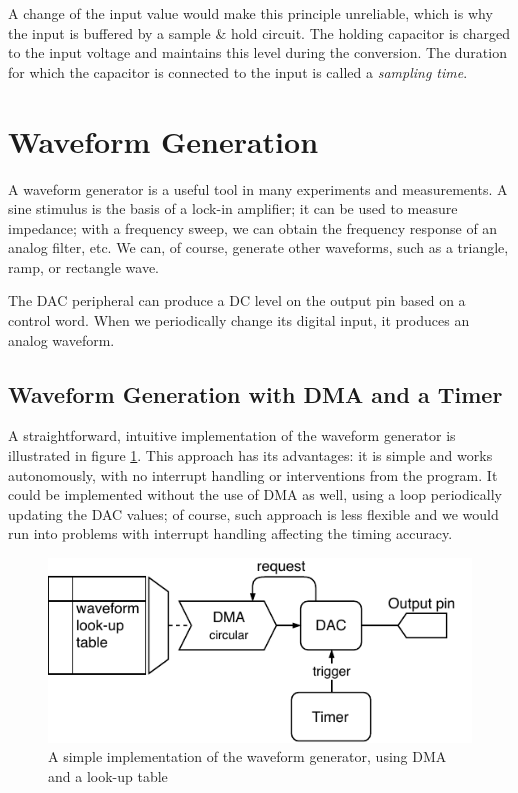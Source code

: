 A change of the input value would make this principle unreliable, which is why the input is buffered by a sample \& hold circuit. The holding capacitor is charged to the input voltage and maintains this level during the conversion. The duration for which the capacitor is connected to the input is called a \textit{sampling time}.

\section{Waveform Generation} \label{sec:theory-dac}

A waveform generator is a useful tool in many experiments and measurements. A sine stimulus is the basis of a lock-in amplifier; it can be used to measure impedance; with a frequency sweep, we can obtain the frequency response of an analog filter, etc. We can, of course, generate other waveforms, such as a triangle, ramp, or rectangle wave.

The \gls{DAC} peripheral can produce a \gls{DC} level on the output pin based on a control word. When we periodically change its digital input, it produces an analog waveform.

\subsection{Waveform Generation with DMA and a Timer} \label{sec:theory-dac-simple}

A straightforward, intuitive implementation of the waveform generator is illustrated in figure \ref{fig:wavegen-naive}. This approach has its advantages: it is simple and works autonomously, with no interrupt handling or interventions from the program. It could be implemented without the use of \gls{DMA} as well, using a loop periodically updating the \gls{DAC} values; of course, such approach is less flexible and we would run into problems with interrupt handling affecting the timing accuracy.

\begin{figure}[h]
	\centering
	\includegraphics[scale=1.1] {img/wavegen-naive.pdf}
	\caption[A simple implementation of the waveform generator]{\label{fig:wavegen-naive}A simple implementation of the waveform generator, using DMA and a look-up table}
\end{figure}

